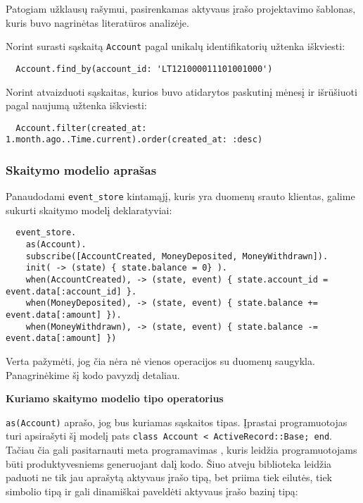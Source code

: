 Patogiam užklausų rašymui, pasirenkamas aktyvaus įrašo projektavimo šablonas, kuris buvo nagrinėtas literatūros analizėje.

Norint surasti sąskaitą \lstinline|Account| pagal unikalų identifikatorių užtenka iškviesti:

\begin{lstlisting}
  Account.find_by(account_id: 'LT121000011101001000')
\end{lstlisting}

Norint atvaizduoti sąskaitas, kurios buvo atidarytos paskutinį mėnesį ir išrūšiuoti pagal naujumą užtenka iškviesti:

\begin{lstlisting}
  Account.filter(created_at: 1.month.ago..Time.current).order(created_at: :desc)
\end{lstlisting}

\subsubsection{Skaitymo modelio aprašas}

Panaudodami \lstinline|event_store| kintamąjį, kuris yra duomenų srauto klientas, galime sukurti skaitymo modelį deklaratyviai:

\begin{lstlisting}
  event_store.
    as(Account).
    subscribe([AccountCreated, MoneyDeposited, MoneyWithdrawn]).
    init( -> (state) { state.balance = 0} ).
    when(AccountCreated), -> (state, event) { state.account_id = event.data[:account_id] }.
    when(MoneyDeposited), -> (state, event) { state.balance += event.data[:amount] }).
    when(MoneyWithdrawn), -> (state, event) { state.balance -= event.data[:amount] })
\end{lstlisting}

Verta pažymėti, jog čia nėra nė vienos operacijos su duomenų saugykla. Panagrinėkime šį kodo pavyzdį detaliau.

\textbf{Kuriamo skaitymo modelio tipo operatorius}

\lstinline|as(Account)| aprašo, jog bus kuriamas sąskaitos tipas. Įprastai programuotojas turi apsirašyti šį modelį pats \lstinline|class Account < ActiveRecord::Base; end|. Tačiau čia gali pasitarnauti meta programavimas \cite{Olsen:2007:DPR:1349728}, kuris leidžia programuotojams būti produktyvesniems generuojant dalį kodo. Šiuo atveju biblioteka leidžia paduoti ne tik jau aprašytą aktyvaus įrašo tipą, bet priima tiek eilutės, tiek simbolio tipą ir gali dinamiškai paveldėti aktyvaus įrašo bazinį tipą:

